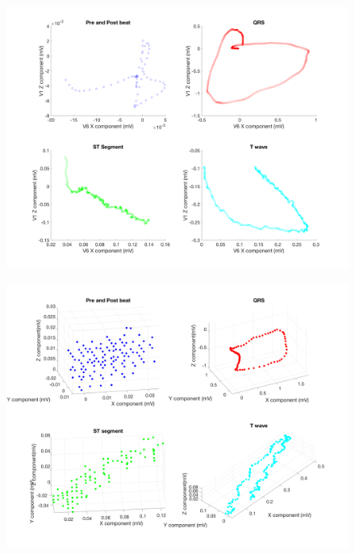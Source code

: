 \documentclass[12pt]{article}
\begin{document}
\begin{figure}[H]
	
	\centering
	\includegraphics[width = .95\textwidth]{Figures/Precordial_V1V6.png}
	\caption{ }
	\label{fig:PrecordVect}
\end{figure}

\begin{figure}[H]
	
	\centering
	\includegraphics[width = .95\textwidth]{Figures/BSP_run1_3d.png}
	\caption{ }
	\label{fig:BSP1}
\end{figure}
\end{document}
